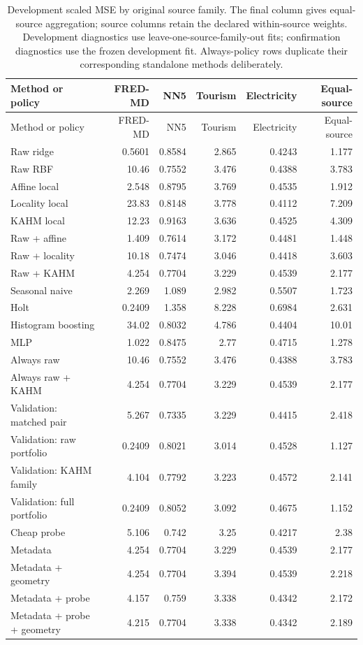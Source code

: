 {\small\setlength{\tabcolsep}{4pt}
\begin{longtable}{lrrrrr}
\caption{Development scaled MSE by original source family. The final column gives equal-source aggregation; source columns retain the declared within-source weights. Development diagnostics use leave-one-source-family-out fits; confirmation diagnostics use the frozen development fit. Always-policy rows duplicate their corresponding standalone methods deliberately.}\label{tab:source-development-loss}\\
\toprule
Method or policy & FRED-MD & NN5 & Tourism & Electricity & Equal-source \\
\midrule
\endfirsthead
\toprule
Method or policy & FRED-MD & NN5 & Tourism & Electricity & Equal-source \\
\midrule
\endhead
Raw ridge & 0.5601 & 0.8584 & 2.865 & 0.4243 & 1.177 \\
Raw RBF & 10.46 & 0.7552 & 3.476 & 0.4388 & 3.783 \\
Affine local & 2.548 & 0.8795 & 3.769 & 0.4535 & 1.912 \\
Locality local & 23.83 & 0.8148 & 3.778 & 0.4112 & 7.209 \\
KAHM local & 12.23 & 0.9163 & 3.636 & 0.4525 & 4.309 \\
Raw + affine & 1.409 & 0.7614 & 3.172 & 0.4481 & 1.448 \\
Raw + locality & 10.18 & 0.7474 & 3.046 & 0.4418 & 3.603 \\
Raw + KAHM & 4.254 & 0.7704 & 3.229 & 0.4539 & 2.177 \\
Seasonal naive & 2.269 & 1.089 & 2.982 & 0.5507 & 1.723 \\
Holt & 0.2409 & 1.358 & 8.228 & 0.6984 & 2.631 \\
Histogram boosting & 34.02 & 0.8032 & 4.786 & 0.4404 & 10.01 \\
MLP & 1.022 & 0.8475 & 2.77 & 0.4715 & 1.278 \\
Always raw & 10.46 & 0.7552 & 3.476 & 0.4388 & 3.783 \\
Always raw + KAHM & 4.254 & 0.7704 & 3.229 & 0.4539 & 2.177 \\
Validation: matched pair & 5.267 & 0.7335 & 3.229 & 0.4415 & 2.418 \\
Validation: raw portfolio & 0.2409 & 0.8021 & 3.014 & 0.4528 & 1.127 \\
Validation: KAHM family & 4.104 & 0.7792 & 3.223 & 0.4572 & 2.141 \\
Validation: full portfolio & 0.2409 & 0.8052 & 3.092 & 0.4675 & 1.152 \\
Cheap probe & 5.106 & 0.742 & 3.25 & 0.4217 & 2.38 \\
Metadata & 4.254 & 0.7704 & 3.229 & 0.4539 & 2.177 \\
Metadata + geometry & 4.254 & 0.7704 & 3.394 & 0.4539 & 2.218 \\
Metadata + probe & 4.157 & 0.759 & 3.338 & 0.4342 & 2.172 \\
Metadata + probe + geometry & 4.215 & 0.7704 & 3.338 & 0.4342 & 2.189 \\
\bottomrule
\end{longtable}
}


